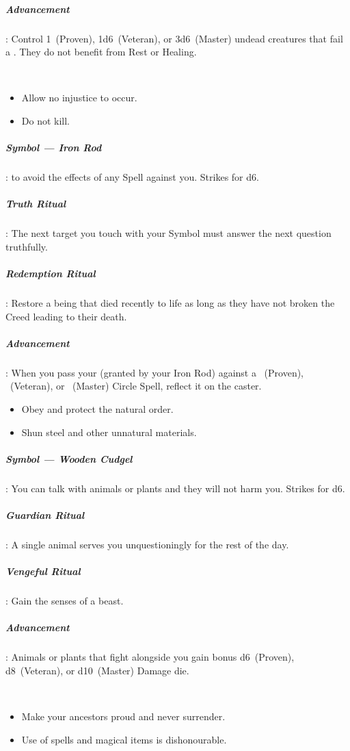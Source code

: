 \documentclass[itdr]{subfiles}
\begin{document}
\subparagraph{Advancement}: Control 1~(Proven), 1d6~(Veteran), or 3d6~(Master) undead creatures that fail a . They do not benefit from Rest or Healing.

~

{\em\begin{itemize}
		\item Allow no injustice to occur.
		\item Do not kill.
\end{itemize}}

\subparagraph{Symbol --- Iron Rod}:  to avoid the effects of any Spell against you. Strikes for d6.

\subparagraph{Truth Ritual}: The next target you touch with your Symbol must answer the next question truthfully.

\subparagraph{Redemption Ritual}: Restore a being that died recently to life as long as they have not broken the Creed leading to their death.

\subparagraph{Advancement}: When you pass your  (granted by your Iron Rod) against a ~(Proven), ~(Veteran), or ~(Master) Circle Spell, reflect it on the caster.

\vfill
\break

{\em\begin{itemize}
		\item Obey and protect the natural order.
		\item Shun steel and other unnatural materials.
\end{itemize}}

\subparagraph{Symbol --- Wooden Cudgel}: You can talk with animals or plants and they will not harm you. Strikes for d6.

\subparagraph{Guardian Ritual}: A single animal serves you unquestioningly for the rest of the day.

\subparagraph{Vengeful Ritual}: Gain the senses of a beast.

\subparagraph{Advancement}: Animals or plants that fight alongside you gain bonus d6~(Proven), d8~(Veteran), or d10~(Master) Damage die.

~

{\em\begin{itemize}
		\item Make your ancestors proud and never surrender.
		\item Use of spells and magical items is dishonourable.
\end{itemize}}
\end{document}
